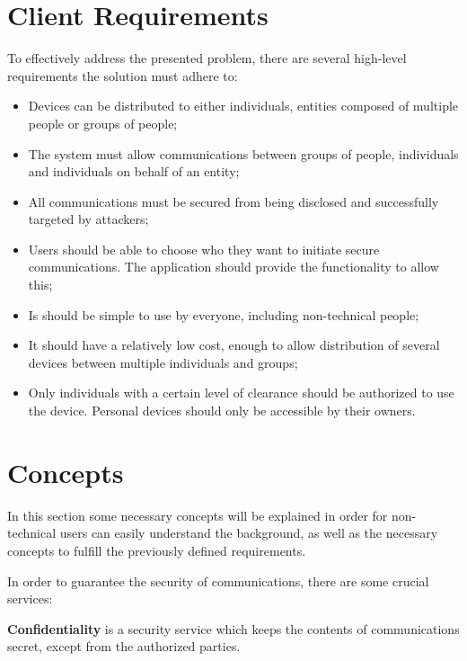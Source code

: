 \section{Client Requirements} \label{chap:problem:requirements}


To effectively address the presented problem, there are several high-level requirements the solution must adhere to:
\begin{itemize}
	\item Devices can be distributed to either individuals, entities composed of multiple people or groups of people;
	\item The system must allow communications between groups of people, individuals and individuals on behalf of an entity;
	\item All communications must be secured from being disclosed and successfully targeted by attackers;
	\item Users should be able to choose who they want to initiate secure communications. The application should provide the functionality to allow this;
	\item Is should be simple to use by everyone, including non-technical people;
	\item It should have a relatively low cost, enough to allow distribution of several devices between multiple individuals and groups;
	\item Only individuals with a certain level of clearance should be authorized to use the device. Personal devices should only be accessible by their owners.
\end{itemize}

\section{Concepts} \label{chap:problem:concepts}

In this section some necessary concepts will be explained in order for non-technical users can easily understand the background, as well as the necessary concepts to fulfill the previously defined requirements.

In order to guarantee the security of communications, there are some crucial services:

\textbf{Confidentiality} is a security service which keeps the contents of communications secret, except from the authorized parties.

